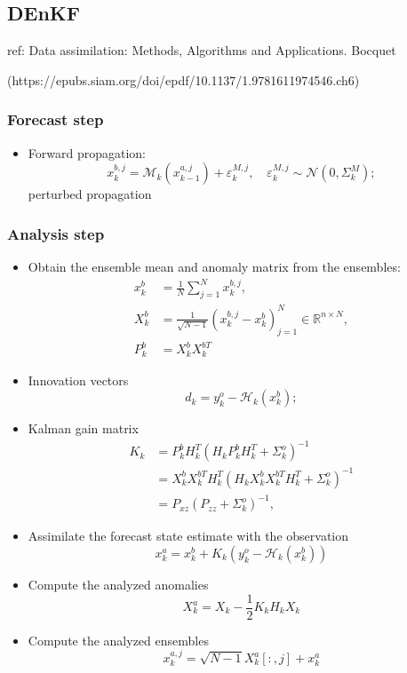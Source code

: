\documentclass{article}
\begin{document}
\subsection{DEnKF}
ref:
Data assimilation: Methods, Algorithms and Applications. Bocquet

(https://epubs.siam.org/doi/epdf/10.1137/1.9781611974546.ch6)

\subsubsection{Forecast step}
\begin{itemize}
	\item Forward propagation:
	      $$
		      x_k^{b,j}=\mathcal{M}_k(x_{k-1}^{a,j})+\varepsilon_k^{M,j},\quad \varepsilon_k^{M,j}\sim\mathcal{N}(0,\Sigma_k^M);
	      $$
	      perturbed propagation
\end{itemize}

\subsubsection{Analysis step}
\begin{itemize}
	\item Obtain the ensemble mean and anomaly matrix from the ensembles:
	      \begin{align*}
		      x_k^b & = \frac1N\sum_{j=1}^Nx_k^{b,j},                                           \\
		      X_k^b & = \frac1{\sqrt{N-1}}(x_k^{b,j} - x_k^b)_{j=1}^N\in\mathbb{R}^{n\times N}, \\
		      P_k^b & = X_k^bX_k^{bT}
	      \end{align*}
	\item Innovation vectors
	      $$
		      d_k = y_k^o - \mathcal{H}_k(x_k^b);
	      $$
	\item Kalman gain matrix
	      \begin{align*}
		      K_k & = P_k^bH_k^T(H_kP_k^bH_k^T+\Sigma_k^o)^{-1}                 \\
		          & = X_k^bX_k^{bT}H_k^T(H_kX_k^bX_k^{bT}H_k^T+\Sigma_k^o)^{-1} \\
		          & = P_{xz}(P_{zz}+\Sigma_k^o)^{-1},
	      \end{align*}
	\item Assimilate the forecast state estimate with the observation
	      $$
		      x_k^a = x_k^b + K_k(y_k^o - \mathcal{H}_k(x_k^b))
	      $$
	\item Compute the analyzed anomalies
	      $$
		      X_k^a = X_k-\frac12K_kH_kX_k
	      $$
	\item Compute the analyzed ensembles
	      $$
		      x_k^{a,j} = \sqrt{N-1}X_k^a[:, j] + x_k^a
	      $$
\end{itemize}
\end{document}
